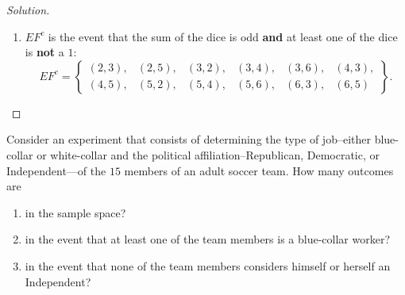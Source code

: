 \documentclass{article}[12pt]
\newenvironment{solution}
  {\renewcommand\qedsymbol{$\blacksquare$}\begin{proof}[Solution]}
  {\end{proof}}
\newenvironment{problem}[1]
  {\renewcommand\theinnercustomprblm{#1}\innercustomprblm}
  {\endinnercustomprblm}
\begin{document}
\begin{solution}
\begin{enumerate}
    \item $EF^{c}$ is the event that the sum of the dice is odd \textbf{and} at least one of the dice is \textbf{not} a $1$:
    \begin{equation*}
        EF^{c} =
        \begin{Bmatrix}
        (2, 3), & (2, 5), & (3, 2), & (3, 4), & (3, 6), & (4, 3),
        \\
        (4, 5), & (5, 2), & (5, 4), & (5, 6), & (6, 3), & (6, 5)
        \end{Bmatrix}.
    \end{equation*}
\end{enumerate}
\end{solution}

\begin{problem}{7}\normalfont
Consider an experiment that consists of determining the type of job--either blue-collar or white-collar and the political affiliation--Republican, Democratic, or Independent—of the $15$ members of an adult soccer team.
How many outcomes are
\begin{enumerate}[label=(\alph*)]
    \item in the sample space?
    \item in the event that at least one of the team members is a blue-collar worker?
    \item in the event that none of the team members considers himself or herself an Independent?
\end{enumerate}
\end{problem}
\end{document}
